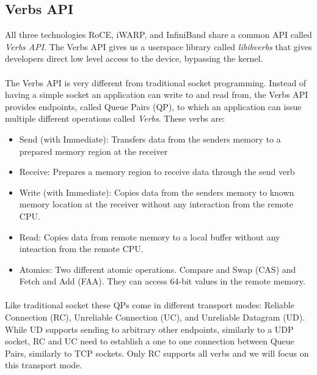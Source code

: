 \subsection{Verbs API}

All three technologies RoCE, iWARP, and InfiniBand share a common API called \emph{Verbs API}. The Verbs API gives us a
userspace library called \emph{libibverbs} that gives developers direct low level access to the device, bypassing the kernel.

\paragraph{} The Verbs API is very different from traditional socket programming. Instead of having a simple socket an 
application can write to and read from, the Verbs API provides endpoints, called Queue Pairs (QP), to which an application 
can issue multiple different operations called \emph{Verbs}. These verbs are:

\begin{itemize}
  \item Send (with Immediate): Transfers data from the senders memory to a prepared memory region at the receiver
  \item Receive: Prepares a memory region to receive data through the send verb
  \item Write (with Immediate): Copies data from the senders memory to known memory location at the receiver without any 
    interaction from the remote CPU.
  \item Read: Copies data from remote memory to a local buffer without any inteaction from the remote CPU.
  \item Atomics: Two different atomic operations. Compare and Swap (CAS) and Fetch and Add (FAA). They can access 64-bit 
    values in the remote memory. 
\end{itemize}

\paragraph{} Like traditional socket these QPs come in different transport modes: Reliable Connection (RC), Unreliable Connection (UC),
and Unreliable Datagram (UD). While UD supports sending to arbitrary other endpoints, similarly to a UDP socket, RC and UC 
need to establish a one to one connection between Queue Pairs, similarly to TCP sockets. Only RC supports all 
verbs and we will focus on this transport mode.


